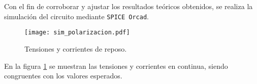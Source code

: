 Con el fin de corroborar y ajustar los resultados teóricos obtenidos, se realiza la simulación del circuito mediante \texttt{SPICE Orcad}.

\begin{figure}[H]
	\centering
	\texttt{[image: sim\_polarizacion.pdf]}
	\caption{Tensiones y corrientes de reposo.}
	\label{fig:sim_pol}
\end{figure}


En la figura \ref{fig:sim_pol} se muestran las tensiones y corrientes en continua, siendo congruentes con los valores esperados.

